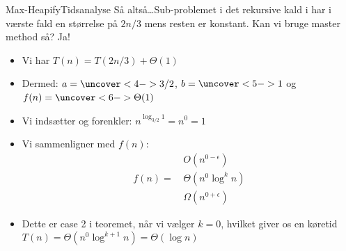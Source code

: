 \documentclass[aspectratio=1610]{beamer}
\begin{document}
\begin{frame}{Max-Heapify}{Tidsanalyse}
    Så altså\ldots Sub-problemet i det rekursive kald i  har i
    værste fald en størrelse på $2n/3$ mens resten er konstant. Kan vi bruge
    master method så? \pause \alert{Ja!}

    \pause

    \begin{itemize}
        \item Vi har $T(n) = T(2n/3) + \Theta(1)$
        \item Dermed: $a = \uncover<4->{3/2}$, $b = \uncover<5->{1}$ og $f(n) =
            \uncover<6->{\Theta(1)}$
        \item<7-> Vi indsætter og forenkler: $n^{\log_{3/2} 1} = n^{0} = 1$
        \item<8-> Vi sammenligner med $f(n)$:
            \begin{align*}
                       &O(n^{0-\epsilon}) \\
                f(n)=\,&\Theta(n^0 \log^{k} n) \\
                       &\Omega(n^{0+\epsilon})
            \end{align*}
        \item<9-> Dette er \alert{case 2} i teoremet, når vi vælger $k=0$, hvilket
            giver os en køretid $T(n) = \Theta(n^0 \log^{k+1} n) = \Theta(\log
            n)$
    \end{itemize}

\end{frame}
\end{document}
